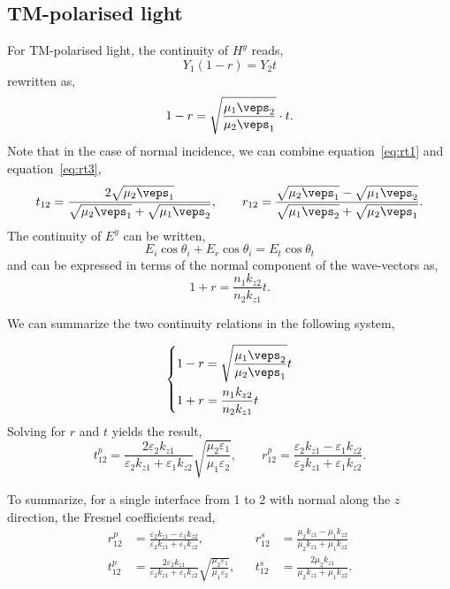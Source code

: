 \documentclass[a4paper,11pt]{article}
\begin{document}
\subsection{TM-polarised light} %
\label{sub:tm_polarised_light}
For TM-polarised light, the continuity of $H^y$ reads,
\[
Y_1 (1 - r) = Y_2 t
\]
rewritten as,
\begin{equation}
	1 - r =\sqrt{\frac{\mu_1\veps_2}{\mu_2\veps_1}}\cdot t.
\label{eq:rt3}
\end{equation}
Note that in the case of normal incidence, we can combine equation~\ref{eq:rt1} and equation~\ref{eq:rt3}, 
\[
t_{12} = \frac{2\sqrt{\mu_2\veps_1}}{\sqrt{\mu_2\veps_1}+\sqrt{\mu_1\veps_2}}, \qquad r_{12}=\frac{\sqrt{\mu_2\veps_1}-\sqrt{\mu_1\veps_2}}{\sqrt{\mu_1\veps_2}+\sqrt{\mu_2\veps_1}}.
\]
The continuity of $E^y$ can be written,
\[
E_i\cos\theta_i + E_r\cos\theta_i  = E_t\cos\theta_t
\]
and can be expressed in terms of the normal component of the wave-vectors as,
\[
1 + r = \frac{n_1k_{z2}}{n_2k_{z1}}t.
\]

We can summarize the two continuity relations in the following system,

\begin{equation*} \left\{
\begin{aligned}
1 - r &=\sqrt{\frac{\mu_1\veps_2}{\mu_2\veps_1}}t\\
1 + r &=\frac{n_1k_{z2}}{n_2k_{z1}}t
\end{aligned}\right.
\end{equation*}
% 
Solving for $r$ and $t$ yields the result,
\begin{equation} 
t_{12}^p=\frac{2\varepsilon_2 k_{z1}}{\varepsilon_2 k_{z1}+\varepsilon_1k_{z2}}\sqrt{\frac{\mu_2\varepsilon_1}{\mu_1\varepsilon_2}},\qquad r_{12}^p=\frac{\varepsilon_2 k_{z1}-\varepsilon_1k_{z2}}{\varepsilon_2 k_{z1}+\varepsilon_1k_{z2}}.
\label{eq:fresnelp}
\end{equation}

To summarize, for a single interface from 1 to 2 with normal along the $z$ direction, the Fresnel coefficients read,
	\begin{equation} 
	\begin{aligned}
	r_{12}^p&=\frac{\varepsilon_2 k_{z1}-\varepsilon_1k_{z2}}{\varepsilon_2 k_{z1}+\varepsilon_1k_{z2}},&{}& r_{12}^s&=\frac{\mu_2 k_{z1}-\mu_1k_{z2}}{\mu_2 k_{z1}+\mu_1k_{z2}}\\
	t_{12}^p&=\frac{2\varepsilon_2 k_{z1}}{\varepsilon_2 k_{z1}+\varepsilon_1k_{z2}}\sqrt{\frac{\mu_2\varepsilon_1}{\mu_1\varepsilon_2}},&{}& t_{12}^s&=\frac{2\mu_2 k_{z1}}{\mu_2 k_{z1}+\mu_1k_{z2}}.
	\end{aligned}
	\label{eq:fresnel}
	\end{equation}
\end{document}
